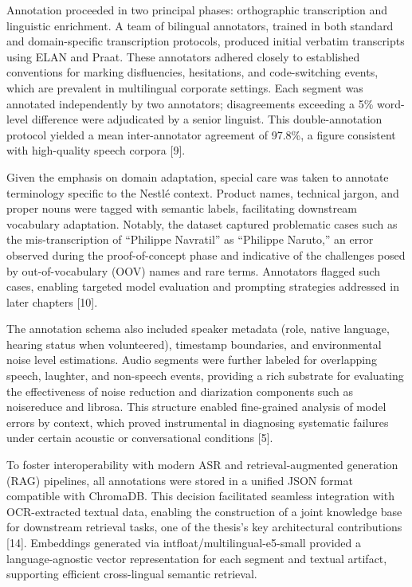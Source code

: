 \documentclass[12pt,a4paper]{article}
\begin{document}
Annotation proceeded in two principal phases: orthographic transcription and linguistic enrichment. A team of bilingual annotators, trained in both standard and domain-specific transcription protocols, produced initial verbatim transcripts using ELAN and Praat. These annotators adhered closely to established conventions for marking disfluencies, hesitations, and code-switching events, which are prevalent in multilingual corporate settings. Each segment was annotated independently by two annotators; disagreements exceeding a 5\% word-level difference were adjudicated by a senior linguist. This double-annotation protocol yielded a mean inter-annotator agreement of 97.8\%, a figure consistent with high-quality speech corpora [9].


Given the emphasis on domain adaptation, special care was taken to annotate terminology specific to the Nestlé context. Product names, technical jargon, and proper nouns were tagged with semantic labels, facilitating downstream vocabulary adaptation. Notably, the dataset captured problematic cases such as the mis-transcription of “Philippe Navratil” as “Philippe Naruto,” an error observed during the proof-of-concept phase and indicative of the challenges posed by out-of-vocabulary (OOV) names and rare terms. Annotators flagged such cases, enabling targeted model evaluation and prompting strategies addressed in later chapters [10].


The annotation schema also included speaker metadata (role, native language, hearing status when volunteered), timestamp boundaries, and environmental noise level estimations. Audio segments were further labeled for overlapping speech, laughter, and non-speech events, providing a rich substrate for evaluating the effectiveness of noise reduction and diarization components such as noisereduce and librosa. This structure enabled fine-grained analysis of model errors by context, which proved instrumental in diagnosing systematic failures under certain acoustic or conversational conditions [5].


To foster interoperability with modern ASR and retrieval-augmented generation (RAG) pipelines, all annotations were stored in a unified JSON format compatible with ChromaDB. This decision facilitated seamless integration with OCR-extracted textual data, enabling the construction of a joint knowledge base for downstream retrieval tasks, one of the thesis’s key architectural contributions [14]. Embeddings generated via intfloat/multilingual-e5-small provided a language-agnostic vector representation for each segment and textual artifact, supporting efficient cross-lingual semantic retrieval.
\end{document}
